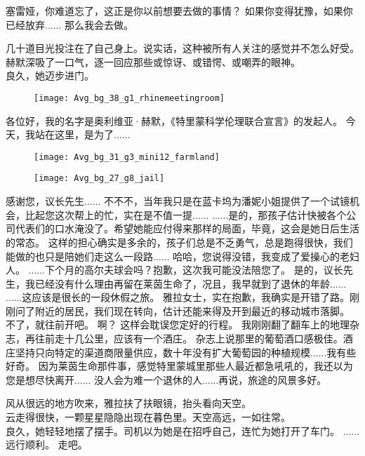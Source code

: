 \documentclass[openany]{book}
\begin{document}
\begin{dialogue}
     塞雷娅，你难道忘了，这正是你以前想要去做的事情？
     如果你变得犹豫，如果你已经放弃......
     那么我会去做。\par
    几十道目光投注在了自己身上。说实话，这种被所有人关注的感觉并不怎么好受。\\
    赫默深吸了一口气，逐一回应那些或惊讶、或错愕、或嘲弄的眼神。\\
    良久，她迈步进门。
    \begin{figure}[h]
        \centering
        \texttt{[image: Avg\_bg\_38\_g1\_rhinemeetingroom]}
    \end{figure}
     各位好，我的名字是奥利维亚·赫默，《特里蒙科学伦理联合宣言》的发起人。
     今天，我站在这里，是为了......
\end{dialogue}

\begin{figure}[h]
    \centering
    \texttt{[image: Avg\_bg\_31\_g3\_mini12\_farmland]}
\end{figure}
\begin{figure}[h]
    \centering
    \texttt{[image: Avg\_bg\_27\_g8\_jail]}
\end{figure}
\begin{dialogue}
     感谢您，议长先生......
     不不不，当年我只是在蓝卡坞为潘妮小姐提供了一个试镜机会，比起您这次帮上的忙，实在是不值一提......
     ......是的，那孩子估计快被各个公司代表们的口水淹没了。希望她能应付得来那样的局面，毕竟，这会是她日后生活的常态。
     这样的担心确实是多余的，孩子们总是不乏勇气，总是跑得很快，我们能做的也只是陪她们走这么一段路......
     哈哈，您说得没错，我变成了爱操心的老妇人。
     ......下个月的高尔夫球会吗？抱歉，这次我可能没法陪您了。
     是的，议长先生，我已经没有什么理由再留在莱茵生命了，况且，我早就到了退休的年龄......
     ......这应该是很长的一段休假之旅。
     雅拉女士，实在抱歉，我确实是开错了路。刚刚问了附近的居民，我们现在转向，估计还能来得及开到最近的移动城市落脚。
     不了，就往前开吧。
     啊？
     这样会耽误您定好的行程。
     我刚刚翻了翻车上的地理杂志，再往前走十几公里，应该有一个酒庄。
     杂志上说那里的葡萄酒口感极佳。酒庄坚持只向特定的渠道商限量供应，数十年没有扩大葡萄园的种植规模......我有些好奇。
     因为莱茵生命那件事，感觉特里蒙城里那些人最近都急吼吼的，我还以为您是想尽快离开......
     没人会为难一个退休的人......再说，旅途的风景多好。\par
    风从很远的地方吹来，雅拉扶了扶眼镜，抬头看向天空。\\
    云走得很快，一颗星星隐隐出现在暮色里。天空高远，一如往常。\\
    良久，她轻轻地摆了摆手。司机以为她是在招呼自己，连忙为她打开了车门。
     ......远行顺利。
     走吧。
\end{dialogue}
\end{document}
